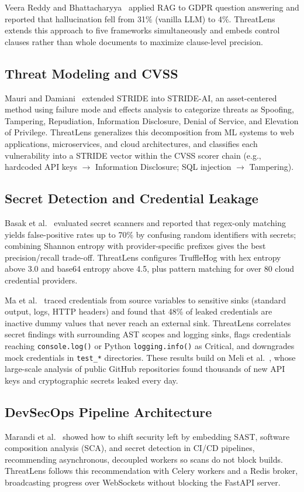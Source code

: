 \documentclass[conference]{IEEEtran}
\begin{document}
Veera Reddy and Bhattacharyya~\cite{veeraReddy2024} applied RAG to GDPR
question answering and reported that hallucination fell from 31\% (vanilla LLM)
to 4\%. ThreatLens extends this approach to five frameworks simultaneously and
embeds control clauses rather than whole documents to maximize clause-level
precision.

\subsection{Threat Modeling and CVSS}
Mauri and Damiani~\cite{mauri2022stride} extended STRIDE into STRIDE-AI, an
asset-centered method using failure mode and effects analysis to categorize
threats as Spoofing, Tampering, Repudiation, Information Disclosure, Denial of
Service, and Elevation of Privilege. ThreatLens generalizes this decomposition
from ML systems to web applications, microservices, and cloud architectures, and
classifies each vulnerability into a STRIDE vector within the CVSS scorer chain
(e.g., hardcoded API keys $\to$ Information Disclosure; SQL injection $\to$
Tampering).

\subsection{Secret Detection and Credential Leakage}
Basak et al.~\cite{setu2023secretbench} evaluated secret scanners and reported
that regex-only matching yields false-positive rates up to 70\% by confusing
random identifiers with secrets; combining Shannon entropy with
provider-specific prefixes gives the best precision/recall trade-off.
ThreatLens configures TruffleHog with hex entropy above 3.0 and base64 entropy
above 4.5, plus pattern matching for over 80 cloud credential providers.

Ma et al.~\cite{ma2024seagull} traced credentials from source variables to
sensitive sinks (standard output, logs, HTTP headers) and found that 48\% of
leaked credentials are inactive dummy values that never reach an external sink.
ThreatLens correlates secret findings with surrounding AST scopes and logging
sinks, flags credentials reaching \texttt{console.log()} or Python
\texttt{logging.info()} as Critical, and downgrades mock credentials in
\texttt{test\_*} directories. These results build on Meli et
al.~\cite{meli2019}, whose large-scale analysis of public GitHub repositories
found thousands of new API keys and cryptographic secrets leaked every day.

\subsection{DevSecOps Pipeline Architecture}
Marandi et al.~\cite{marandi2023devsecops} showed how to shift security left by
embedding SAST, software composition analysis (SCA), and secret detection in
CI/CD pipelines, recommending asynchronous, decoupled workers so scans do not
block builds. ThreatLens follows this recommendation with Celery workers and a
Redis broker, broadcasting progress over WebSockets without blocking the FastAPI
server.
\end{document}
